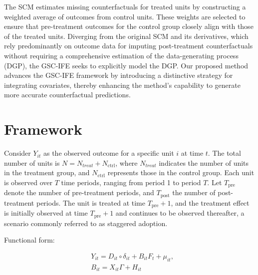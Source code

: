 \documentclass[12pt]{article}
\begin{document}
The SCM estimates missing counterfactuals for treated units by constructing a weighted average of outcomes from control units. These weights are selected to ensure that pre-treatment outcomes for the control group closely align with those of the treated units. Diverging from the original SCM and its derivatives, which rely predominantly on outcome data for imputing post-treatment counterfactuals without requiring a comprehensive estimation of the data-generating process (DGP), the GSC-IFE seeks to explicitly model the DGP. Our proposed method advances the GSC-IFE framework by introducing a distinctive strategy for integrating covariates, thereby enhancing the method's capability to generate more accurate counterfactual predictions.




 
\section{Framework} 
\label{sec: framework}

Consider $Y_{it}$ as the observed outcome for a specific unit $i$ at time $t$. The total number of units is $N = N_{treat} + N_{\text{ctrl}}$, where $N_{treat}$ indicates the number of units in the treatment group, and $N_{\text{ctrl}}$ represents those in the control group. Each unit is observed over $T$ time periods, ranging from period 1 to period $T$. Let $T_{\text{pre}}$ denote the number of pre-treatment periods, and $T_{\text{post}}$ the number of post-treatment periods. The unit is treated at time $T_{\text{pre}} + 1$, and the treatment effect is initially observed at time $T_{\text{pre}} + 1$ and continues to be observed thereafter, a scenario commonly referred to as staggered adoption.

\begin{assumption}
Functional form:
\label{ass: function}
\end{assumption}

\begin{equation}
\begin{aligned}
& Y_{it} = D_{it} \circ \delta_{it} + B_{it}F_{t} + \mu_{it}, \\
& B_{it} = X_{it}\Gamma + H_{it}
\end{aligned}
\label{eq: functional form}
\end{equation}
\end{document}
